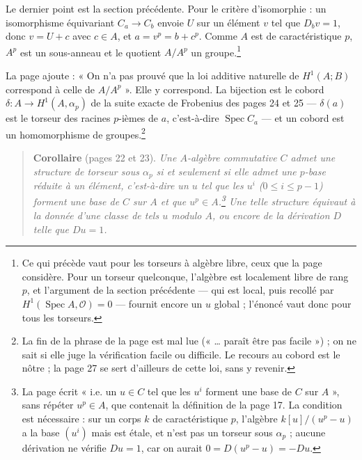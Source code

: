 \documentclass[11pt,a4paper]{article}
\begin{document}
Le dernier point est la section précédente. Pour le critère d'isomorphie :
un isomorphisme équivariant $C_a \to C_b$ envoie $U$ sur un élément $v$ tel
que $D_b v = 1$, donc $v = U + c$ avec $c \in A$, et $a = v^p = b + c^p$.
Comme $A$ est de caractéristique $p$, $A^p$ est un sous-anneau et le
quotient $A/A^p$ un groupe.\footnote{Ce qui précède vaut pour les torseurs à
algèbre libre, ceux que la page considère. Pour un torseur quelconque,
l'algèbre est localement libre de rang $p$, et l'argument de la section
précédente --- qui est local, puis recollé par
$H^1(\operatorname{Spec} A, \mathcal{O}) = 0$ --- fournit encore un $u$
global ; l'énoncé vaut donc pour tous les torseurs.}

La page ajoute : « On n'a pas prouvé que la loi additive naturelle de
$H^1(A; B)$ correspond à celle de $A/A^p$ ». Elle y correspond. La
bijection est le cobord $\delta \colon A \to H^1(A, \alpha_p)$ de la suite
exacte de Frobenius des pages 24 et 25 --- $\delta(a)$ est le torseur des
racines $p$-ièmes de $a$, c'est-à-dire $\operatorname{Spec} C_a$ --- et un
cobord est un homomorphisme de groupes.\footnote{La fin de la phrase de la
page est mal lue (« \ldots{} paraît être pas facile ») ; on ne sait si elle
juge la vérification facile ou difficile. Le recours au cobord est le nôtre ;
la page 27 se sert d'ailleurs de cette loi, sans y revenir.}

\begin{quote}
\textbf{Corollaire} (pages 22 et 23). \emph{Une $A$-algèbre commutative $C$
admet une structure de torseur sous $\alpha_p$ si et seulement si elle admet
une $p$-base réduite à un élément, c'est-à-dire un $u$ tel que les $u^i$
($0 \le i \le p-1$) forment une base de $C$ sur $A$ et que $u^p \in A$.\footnote{La page écrit « i.e. un $u \in C$ tel que les $u^i$ forment une
base de $C$ sur $A$ », sans répéter $u^p \in A$, que contenait la définition
de la page 17. La condition est nécessaire : sur un corps $k$ de
caractéristique $p$, l'algèbre $k[u]/(u^p - u)$ a la base $(u^i)$ mais est
étale, et n'est pas un torseur sous $\alpha_p$ ; aucune dérivation ne
vérifie $Du = 1$, car on aurait $0 = D(u^p - u) = -Du$.} Une
telle structure équivaut à la donnée d'une classe de tels $u$ modulo $A$, ou
encore de la dérivation $D$ telle que $Du = 1$.}
\end{quote}
\end{document}
